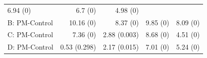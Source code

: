 \documentclass[11pt,]{article}
\begin{document}
\begin{longtable}[]{@{}lrrrr@{}}
\begin{minipage}[t]{0.15\columnwidth}
6.94 (0)\strut
\end{minipage} & \begin{minipage}[t]{0.20\columnwidth}\raggedleft\strut
6.7 (0)\strut
\end{minipage} & \begin{minipage}[t]{0.22\columnwidth}\raggedleft\strut
4.98 (0)\strut
\end{minipage}\tabularnewline
\begin{minipage}[t]{0.15\columnwidth}\raggedright\strut
B: PM-Control\strut
\end{minipage} & \begin{minipage}[t]{0.14\columnwidth}\raggedleft\strut
10.16 (0)\strut
\end{minipage} & \begin{minipage}[t]{0.15\columnwidth}\raggedleft\strut
8.37 (0)\strut
\end{minipage} & \begin{minipage}[t]{0.20\columnwidth}\raggedleft\strut
9.85 (0)\strut
\end{minipage} & \begin{minipage}[t]{0.22\columnwidth}\raggedleft\strut
8.09 (0)\strut
\end{minipage}\tabularnewline
\begin{minipage}[t]{0.15\columnwidth}\raggedright\strut
C: PM-Control\strut
\end{minipage} & \begin{minipage}[t]{0.14\columnwidth}\raggedleft\strut
7.36 (0)\strut
\end{minipage} & \begin{minipage}[t]{0.15\columnwidth}\raggedleft\strut
2.88 (0.003)\strut
\end{minipage} & \begin{minipage}[t]{0.20\columnwidth}\raggedleft\strut
8.68 (0)\strut
\end{minipage} & \begin{minipage}[t]{0.22\columnwidth}\raggedleft\strut
4.51 (0)\strut
\end{minipage}\tabularnewline
\begin{minipage}[t]{0.15\columnwidth}\raggedright\strut
D: PM-Control\strut
\end{minipage} & \begin{minipage}[t]{0.14\columnwidth}\raggedleft\strut
0.53 (0.298)\strut
\end{minipage} & \begin{minipage}[t]{0.15\columnwidth}\raggedleft\strut
2.17 (0.015)\strut
\end{minipage} & \begin{minipage}[t]{0.20\columnwidth}\raggedleft\strut
7.01 (0)\strut
\end{minipage} & \begin{minipage}[t]{0.22\columnwidth}\raggedleft\strut
5.24 (0)\strut
\end{minipage}\tabularnewline
\bottomrule
\end{longtable}
\end{document}

